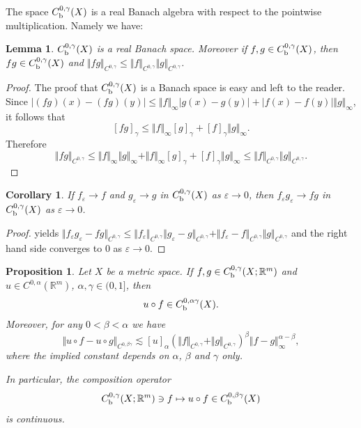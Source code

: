 \documentclass[intlimits,12pt,reqno]{amsart}
\newcommand{\R}{\mathbb R}
\newcommand{\eps}{\varepsilon}
\numberwithin{equation}{section}
\newtheorem{lemma}[theorem]{Lemma}
\newtheorem{corollary}[theorem]{Corollary}
\newtheorem{proposition}[theorem]{Proposition}
\theoremstyle{definition}
\begin{document}
The space $C_{\rm b}^{0,\gamma}(X)$ is a real Banach algebra with respect to the pointwise multiplication. Namely we have:
\begin{lemma}
\label{T27}
$C_{\rm b}^{0,\gamma}(X)$ is a real Banach space. Moreover if $f,g\in C_{\rm b}^{0,\gamma}(X)$, then
$fg\in C_{\rm b}^{0,\gamma}(X)$ and
$\Vert fg\Vert_{C^{0,\gamma}}\leq \Vert f\Vert_{C^{0,\gamma}}\Vert g\Vert_{C^{0,\gamma}}$.
\end{lemma}
\begin{proof}
The proof that $C_{\rm b}^{0,\gamma}(X)$ is a Banach space is easy and left to the reader. Since
$|(fg)(x)-(fg)(y)|\leq\Vert f\Vert_\infty|g(x)-g(y)|+|f(x)-f(y)|\Vert g\Vert_\infty$, it follows that
$$
[fg]_{\gamma}\leq \Vert f\Vert_\infty [g]_{\gamma}+[f]_{\gamma}\Vert g\Vert_\infty.
$$
Therefore
$$
\Vert fg\Vert_{C^{0,\gamma}}\leq \Vert f\Vert_\infty\Vert g\Vert_\infty +
\Vert f\Vert_\infty[g]_{\gamma}+[f]_{\gamma}\Vert g\Vert_\infty\leq \Vert f\Vert_{C^{0,\gamma}}\Vert g\Vert_{C^{0,\gamma}}.
$$
\end{proof}
\begin{corollary}
\label{T28}
If $f_\eps\to f$ and $g_\eps\to g$ in $C_{\rm b}^{0,\gamma}(X)$ as $\eps\to 0$, then $f_\eps g_\eps\to fg$ in $C_{\rm b}^{0,\gamma}(X)$ as $\eps\to 0$.
\end{corollary}
\begin{proof}
 yields    
$\Vert f_\eps g_\eps-fg\Vert_{C^{0,\gamma}}\leq \Vert f_\eps\Vert_{C^{0,\gamma}}\Vert g_\eps-g\Vert_{C^{0,\gamma}}+\Vert f_\eps-f\Vert_{C^{0,\gamma}}\Vert g\Vert_{C^{0,\gamma}}$ and the right hand side converges to $0$ as $\eps\to 0$. 
\end{proof}
\begin{proposition}
\label{T80}
Let $X$ be a metric space. If $f,g\in C_{\rm b}^{0,\gamma}(X;\R^m)$ and $u\in C^{0,\alpha}(\R^m)$, $\alpha,\gamma\in (0,1]$, then
$$
u\circ f\in C^{0,\alpha\gamma}_{\rm b}(X).
$$
Moreover, for any $0<\beta<\alpha$ we have
\begin{equation}
\label{eq83}
\Vert u\circ f-u\circ g\Vert_{C^{0,\beta\gamma}}\lesssim
[u]_{\alpha}\left(\Vert f\Vert_{C^{0,\gamma}}+\Vert g\Vert_{C^{0,\gamma}}\right)^{\beta}
\Vert f-g\Vert_\infty^{\alpha-\beta},
\end{equation}
where the implied constant depends on $\alpha$, $\beta$ and $\gamma$ only.

In particular, the composition operator
\begin{equation}
\label{eq88}
C_{\rm b}^{0,\gamma}(X;\R^m)\ni f\mapsto u\circ f\in C^{0,\beta\gamma}_{\rm b}(X)
\end{equation}
is continuous.
\end{proposition}
\end{document}
